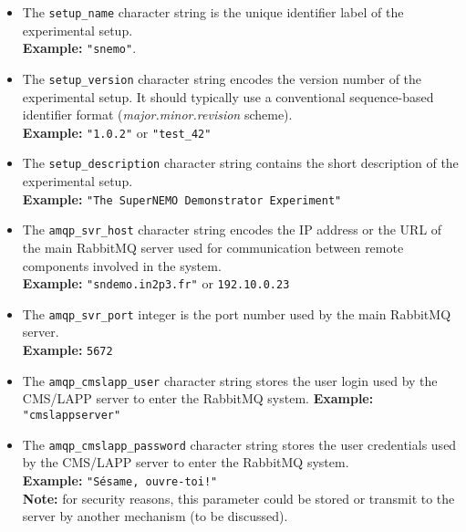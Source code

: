 \begin{itemize}

\item  The   \texttt{setup\_name}  character  string  is   the  unique
  identifier label of the experimental setup. \\
  \noindent \textbf{Example:} \verb+"snemo"+.

\item The \texttt{setup\_version} character string encodes the version
  number  of  the  experimental  setup.  It  should  typically  use  a
  conventional         sequence-based        identifier         format
  (\emph{major.minor.revision} scheme).\\
  \noindent \textbf{Example:} \verb+"1.0.2"+ or \verb+"test_42"+

\item  The \texttt{setup\_description}  character string  contains the
  short description of the experimental setup. \\
  \noindent \textbf{Example:} \verb+"The SuperNEMO Demonstrator Experiment"+

\item  The \texttt{amqp\_svr\_host}  character string  encodes the  IP
  address  or   the  URL  of   the  main  RabbitMQ  server   used  for
  communication between remote components involved in the system.\\
  \noindent \textbf{Example:} \texttt{"sndemo.in2p3.fr"} or \texttt{192.10.0.23}

\item The \texttt{amqp\_svr\_port} integer is  the port number used by
  the main RabbitMQ server.\\
  \noindent \textbf{Example:} \texttt{5672}

\item   The  \texttt{amqp\_cmslapp\_user}   character  string
  stores  the user login used by the CMS/LAPP server to enter
  the RabbitMQ system. %
  \noindent \textbf{Example:} \texttt{"cmslappserver"}

\item   The  \texttt{amqp\_cmslapp\_password}   character  string
  stores  the user credentials used by the CMS/LAPP server to enter
  the RabbitMQ system.\\
  \noindent \textbf{Example:} \texttt{"Sésame, ouvre-toi!"}\\
  \noindent \textbf{Note:} for security reasons, this parameter could be stored or transmit to the server
  by another mechanism (to be discussed).


\end{itemize}
